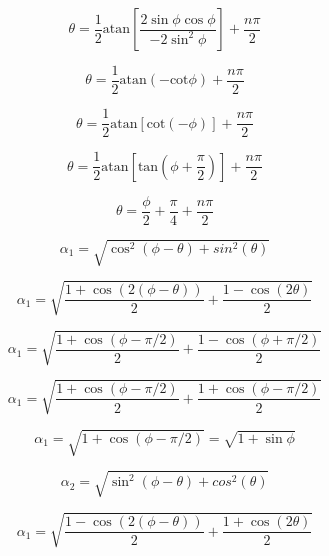 \documentclass{article}
\begin{document}
\begin{equation}
	\theta = \frac{1}{2}\text{atan}\left[\frac{2\sin\phi\cos\phi}{-2\sin^2\phi}\right]+\frac{n\pi}{2}
\end{equation}

\begin{equation}
	\theta = \frac{1}{2}\text{atan}(-\text{cot}\phi)+\frac{n\pi}{2}
\end{equation}

\begin{equation}
	\theta = \frac{1}{2}\text{atan}[\text{cot}(-\phi)]+\frac{n\pi}{2}
\end{equation}

\begin{equation}
	\theta = \frac{1}{2}\text{atan}\left[\text{tan}\left(\phi+\frac{\pi}{2}\right)\right]+\frac{n\pi}{2}
\end{equation}

\begin{equation}
	\theta = \frac{\phi}{2}+\frac{\pi}{4}+\frac{n\pi}{2}
\end{equation}

\begin{equation}
	\alpha_1 = \sqrt{\cos^2(\phi-\theta)+sin^2(\theta)}
\end{equation}

\begin{equation}
	\alpha_1 = \sqrt{\frac{1+\cos(2(\phi-\theta))}{2}+\frac{1-\cos(2\theta)}{2}}
\end{equation}

\begin{equation}
	\alpha_1 = \sqrt{\frac{1+\cos(\phi-\pi/2)}{2}+\frac{1-\cos(\phi+\pi/2)}{2}}
\end{equation}

\begin{equation}
	\alpha_1 = \sqrt{\frac{1+\cos(\phi-\pi/2)}{2}+\frac{1+\cos(\phi-\pi/2)}{2}}
\end{equation}

\begin{equation}
	\alpha_1 = \sqrt{1+\cos(\phi-\pi/2)} = \sqrt{1+\sin\phi}
\end{equation}

\begin{equation}
	\alpha_2 = \sqrt{\sin^2(\phi-\theta)+cos^2(\theta)}
\end{equation}

\begin{equation}
	\alpha_1 = \sqrt{\frac{1-\cos(2(\phi-\theta))}{2}+\frac{1+\cos(2\theta)}{2}}
\end{equation}
\end{document}
